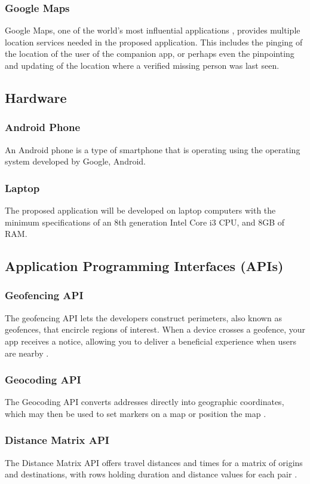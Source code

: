 \subsubsection{Google Maps}
Google Maps, one of the world’s most influential applications \cite{mehta2019google}, provides multiple location services needed in the proposed application. This includes the pinging of the location of the user of the companion app, or perhaps even the pinpointing and updating of the location where a verified missing person was last seen.

\subsection{Hardware}
\subsubsection{Android Phone}
An Android phone is a type of smartphone that is operating using the operating system developed by Google, Android.

\subsubsection{Laptop}
The proposed application will be developed on laptop computers with the minimum specifications of an 8th generation Intel Core i3 CPU, and 8GB of RAM.

\subsection{Application Programming Interfaces (APIs)}
\subsubsection{Geofencing API}
The geofencing API lets the developers construct perimeters, also known as geofences, that encircle regions of interest. When a device crosses a geofence, your app receives a notice, allowing you to deliver a beneficial experience when users are nearby \cite{geofencing}.

\subsubsection{Geocoding API}
The Geocoding API converts addresses directly into geographic coordinates, which may then be used to set markers on a map or position the map  \cite{geocoding}.

\subsubsection{Distance Matrix API}
The Distance Matrix API offers travel distances and times for a matrix of origins and destinations, with rows holding duration and distance values for each pair \cite{distanceMatrix}.

